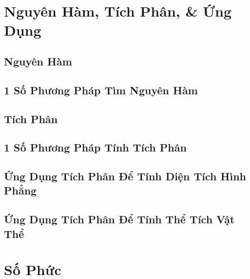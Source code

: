 \documentclass{article}
\numberwithin{equation}{section}
\begin{document}

\section{Nguyên Hàm, Tích Phân, \& Ứng Dụng}

\subsection{Nguyên Hàm}


\subsection{1 Số Phương Pháp Tìm Nguyên Hàm}


\subsection{Tích Phân}


\subsection{1 Số Phương Pháp Tính Tích Phân}


\subsection{Ứng Dụng Tích Phân Để Tính Diện Tích Hình Phẳng}


\subsection{Ứng Dụng Tích Phân Để Tính Thể Tích Vật Thể}


\section{Số Phức}
\end{document}
